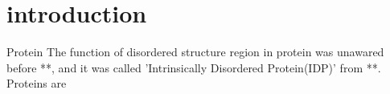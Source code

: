 \section{introduction}
Protein The function of disordered structure region in protein was unawared before **, and it was called 'Intrinsically Disordered Protein(IDP)' from **. Proteins are 